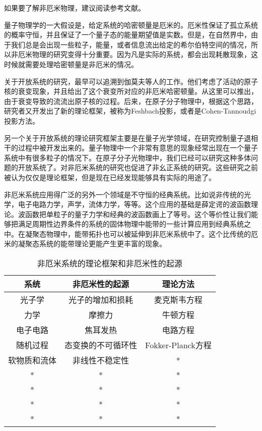 
如果要了解非厄米物理，建议阅读参考文献\cite{Ashida:2020dkc}。

量子物理学的一大假设是，给定系统的哈密顿量是厄米的。厄米性保证了孤立系统的概率守恒，并且保证了一个量子态的能量期望值是实数。但是，在自然界中，由于我们总是会出现一些粒子，能量，或者信息流出给定的希尔伯特空间的情况，所以非厄米物理的研究变得十分重要。因为凡是实际的系统，都会出现耗散现象，这时候就需要处理哈密顿量是非厄米的情况。

关于开放系统的研究，最早可以追溯到伽莫夫等人的工作。他们考虑了活动的原子核的衰变现象，并且给出了这个衰变所对应的非厄米哈密顿量。从这里可以推出，由于衰变导致的流流出原子核的过程。后来，在原子分子物理中，根据这个思路，研究者又开发出了新的理论框架，被称为Feshbach投影，或者是Cohen-Tannoudgi投影方法。

另一个关于开放系统的理论研究框架主要是在量子光学领域，在研究控制量子退相干的过程中被开发出来的。量子物理中一个非常有意思的现象经常出现在一个量子系统中有很多粒子的情况下。在原子分子光物理中，我们已经可以研究这种多体问题的开放系统了。对非厄米系统的研究也促进了非幺正系统的研究。这些研究之前被认为仅仅是理论框架，但是现在已经发现能够具有实际的用途了。

非厄米系统应用得广泛的另外一个领域是不守恒的经典系统。比如说非传统的光学，电子电路力学，声学，流体力学，等等。这个应用的基础是薛定谔的波函数理论。波函数把单粒子的量子力学和经典的波函数画上了等号。这个等价性让我们能够把满足周期性边界条件的系统的固体物理中能带的一些计算应用到经典系统之中。在凝聚态物理中，能带拓扑也可以被延伸到非厄米系统中了。这个比传统的厄米的凝聚态系统的能带理论更能产生更丰富的现象。

\begin{table}[ht]
\centering
\caption{非厄米系统的理论框架和非厄米性的起源}\label{tab_nonHer1}
\begin{tabular}{|c|c|c|}
\hline
系统 & 非厄米性的起源 & 理论方法 \\
\hline
光子学 & 光子的增加和损耗 & 麦克斯韦方程 \\
\hline
力学 & 摩擦力 & 牛顿方程 \\
\hline
电子电路 & 焦耳发热 & 电路方程 \\
\hline
随机过程 & 态变换的不可循环性 & Fokker-Planck方程 \\
\hline
软物质和流体 & 非线性不稳定性 & * \\
\hline
* & * & * \\
\hline
* & * & * \\
\hline
* & * & * \\
\hline
* & * & * \\
\hline
\end{tabular}
\end{table}

